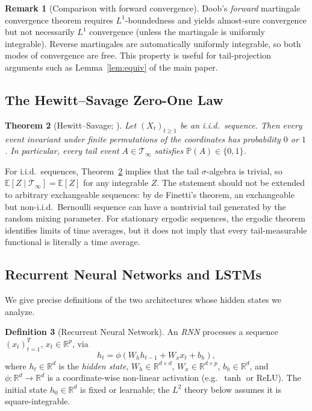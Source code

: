 \documentclass[bj,authoryear]{imsart}
\theoremstyle{plain}
\newtheorem{theorem}{Theorem}[section]
\theoremstyle{definition}
\newtheorem{definition}[theorem]{Definition}
\newtheorem{remark}[theorem]{Remark}
\newcommand{\E}{\mathbb{E}}
\newcommand{\Prob}{\mathbb{P}}
\newcommand{\R}{\mathbb{R}}
\newcommand{\Tsig}{\mathcal{T}_\infty}
\newcommand{\given}{\mid}
\begin{document}
\begin{remark}[Comparison with forward convergence]
  Doob's \emph{forward} martingale convergence theorem requires $L^1$-boundedness
  and yields almost-sure convergence but not necessarily $L^1$ convergence
  (unless the martingale is uniformly integrable).
  Reverse martingales are automatically uniformly integrable, so both modes of
  convergence are free.  This property is useful for tail-projection arguments such as
  Lemma~\ref{lem:equiv} of the main paper.
\end{remark}

\subsection{The Hewitt--Savage Zero-One Law}
\label{app:hw}

\begin{theorem}[Hewitt--Savage; \citealt{hewitt1955symmetric}]
\label{thm:hs}
  Let $(X_t)_{t\geq 1}$ be an i.i.d.\ sequence.  Then every event invariant
  under finite permutations of the coordinates has probability $0$ or $1$.
  In particular, every tail event $A\in\Tsig$ satisfies
  $\Prob(A)\in\{0,1\}$.
\end{theorem}

For i.i.d.\ sequences, Theorem~\ref{thm:hs} implies that the tail
$\sigma$-algebra is trivial, so $\E[Z\given\Tsig]=\E[Z]$ for any integrable
$Z$.  The statement should not be extended to arbitrary exchangeable sequences:
by de Finetti's theorem, an exchangeable but non-i.i.d.\ Bernoulli sequence can
have a nontrivial tail generated by the random mixing parameter.  For stationary
ergodic sequences, the ergodic theorem identifies limits of time averages, but
it does not imply that every tail-measurable functional is literally a time
average.

\subsection{Recurrent Neural Networks and LSTMs}

We give precise definitions of the two architectures whose hidden states we analyze.

\begin{definition}[Recurrent Neural Network]
\label{def:rnn}
  An \emph{RNN} processes a sequence $(x_t)_{t=1}^T$, $x_t \in \R^p$, via
  \begin{equation}
    h_t = \phi(W_h h_{t-1} + W_x x_t + b_h),
    \label{eq:rnn}
  \end{equation}
  where $h_t \in \R^d$ is the \emph{hidden state}, $W_h \in \R^{d\times d}$,
  $W_x \in \R^{d\times p}$, $b_h \in \R^d$, and $\phi:\R^d\to\R^d$ is a
  coordinate-wise non-linear activation (e.g.\ $\tanh$ or ReLU).
  The initial state $h_0 \in \R^d$ is fixed or learnable; the $L^2$ theory below assumes it is square-integrable.
\end{definition}
\end{document}
